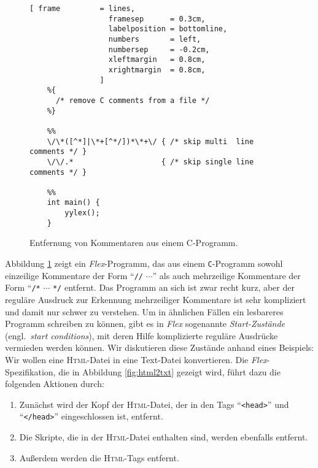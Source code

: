 \begin{figure}[!h]
\centering
\begin{Verbatim}[ frame         = lines, 
                  framesep      = 0.3cm, 
                  labelposition = bottomline,
                  numbers       = left,
                  numbersep     = -0.2cm,
                  xleftmargin   = 0.8cm,
                  xrightmargin  = 0.8cm,
                ]
    %{
      /* remove C comments from a file */
    %}
    
    %%
    \/\*([^*]|\*+[^*/])*\*+\/ { /* skip multi  line comments */ }
    \/\/.*                    { /* skip single line comments */ }
    
    %%
    int main() {
        yylex();
    }
\end{Verbatim}
\vspace*{-0.3cm}
\caption{Entfernung von Kommentaren aus einem C-Programm.}
\label{fig:decoment.l}
\end{figure}

\noindent
Abbildung \ref{fig:decoment.l} zeigt ein \textsl{Flex}-Programm, das aus einem
\texttt{C}-Programm sowohl einzeilige Kommentare der Form ``\texttt{//} $\cdots$''
als auch mehrzeilige Kommentare der Form ``\texttt{/*} $\cdots$ \texttt{*/} entfernt.
Das Programm an sich ist zwar recht kurz, aber der regul\"are Ausdruck zur Erkennung
mehrzeiliger Kommentare ist sehr kompliziert und damit nur schwer zu verstehen.
Um in \"ahnlichen F\"allen ein lesbareres Programm schreiben zu k\"onnen, gibt es in
\textsl{Flex}\/ sogenannte \emph{Start-Zust\"ande} (engl.~\emph{start conditions}), mit deren
Hilfe komplizierte regul\"are Ausdr\"ucke vermieden werden k\"onnen.
Wir diskutieren diese Zust\"ande anhand eines Beispiels: Wir wollen eine
\textsc{Html}-Datei in eine Text-Datei konvertieren.  Die \textsl{Flex}-Spezifikation, die
in Abbildung \ref{fig:html2txt} gezeigt wird, f\"uhrt dazu die folgenden Aktionen durch:
\begin{enumerate}
\item Zun\"achst wird der Kopf der \textsc{Html}-Datei, der in den Tags ``\texttt{<head>}''
      und ``\texttt{</head>}'' eingeschlossen ist, entfernt.
\item Die Skripte, die in der \textsc{Html}-Datei enthalten sind, werden ebenfalls
      entfernt.
\item Au{\ss}erdem werden die \textsc{Html}-Tags entfernt.
\end{enumerate}

